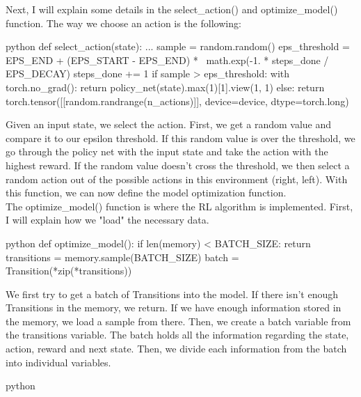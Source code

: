\documentclass{article}
\numberwithin{equation}{section}
\numberwithin{equation}{section}
\begin{document}
Next, I will explain some details in the select\_action() and optimize\_model() function. The way we choose an action is the following:

\begin{mintedbox}{python}
def select_action(state):
...
    sample = random.random()
    eps_threshold = EPS_END + (EPS_START - EPS_END) * \
        math.exp(-1. * steps_done / EPS_DECAY)
    steps_done += 1
    if sample > eps_threshold:
        with torch.no_grad():
            return policy_net(state).max(1)[1].view(1, 1)
    else:
        return torch.tensor([[random.randrange(n_actions)]], device=device, dtype=torch.long)
\end{mintedbox}
Given an input state, we select the action. First, we get a random value and compare it to our epsilon threshold. If this random value is over the threshold, we go through the policy net with the input state and take the action with the highest reward. If the random value doesn't cross the threshold, we then select a random action out of the possible actions in this environment (right, left). With this function, we can now define the model optimization function. \\

The optimize\_model() function is where the RL algorithm is implemented. First, I will explain how we "load" the necessary data.

\begin{mintedbox}{python}
def optimize_model():
    if len(memory) < BATCH_SIZE:
        return
    transitions = memory.sample(BATCH_SIZE)
    batch = Transition(*zip(*transitions))
\end{mintedbox}

We first try to get a batch of Transitions into the model. If there isn't enough Transitions in the memory, we return. If we have enough information stored in the memory, we load a sample from there. Then, we create a batch variable from the transitions variable. The batch holds all the information regarding the state, action, reward and next state. Then, we divide each information from the batch into individual variables.

\begin{mintedbox}{python}



\end{mintedbox} 
\end{document}

